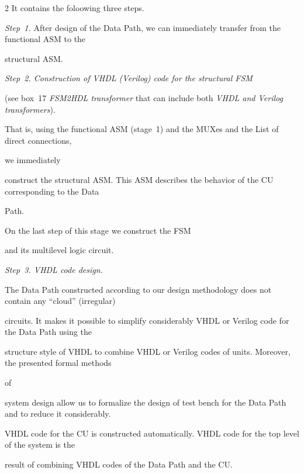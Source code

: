 \begin{multicols}{2}
It contains the foloowing three steps.





\textit{Step~1.} After design of the Data Path, we can immediately transfer from the functional ASM to the


structural ASM.





\textit{Step~2. Construction of VHDL (Verilog) code for the structural FSM}


(see box~17 \textit{FSM2HDL transformer} that can include both \textit{VHDL and Verilog transformers}).





That is, using the functional ASM (stage~1) and the MUXes and the List of direct connections,


we immediately


construct the structural ASM. This ASM describes the behavior of the CU corresponding to the Data


Path. 


On the last step of this stage we construct the FSM


and its multilevel logic circuit.





\textit{Step~3. VHDL code design. }





   The Data Path constructed according to our design methodology does not contain any ``cloud'' (irregular)


circuits. It makes it possible to simplify considerably VHDL or Verilog code for the Data Path using the


structure style of VHDL to combine VHDL or Verilog codes of units. Moreover, the presented formal methods


of


system design allow us to formalize the design of test bench for the Data Path and to reduce it considerably.


VHDL code for the CU is constructed automatically. VHDL code for the top level of the system is the


result of combining VHDL codes of the Data Path and the CU.









\end{multicols}
